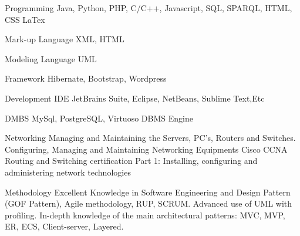 


\begin{cvskills}


\cvskill
{Programming} %
{Java, Python, PHP, C/C++, Javascript, SQL, SPARQL, HTML, CSS LaTex} %

\hline

\cvskill
{Mark-up Language} %
{XML, HTML} %

\hline

\cvskill
{Modeling Language} %
{UML} %

\hline

\cvskill
{Framework} %
{Hibernate, Bootstrap, Wordpress} %

\hline

\cvskill
{Development IDE} %
{JetBrains Suite, Eclipse, NetBeans, Sublime Text,Etc} %

\hline


\cvskill
{DMBS} %
{MySql, PostgreSQL, Virtuoso DBMS Engine} %

\hline

\cvskill
{Networking} %
{Managing and Maintaining the Servers, PC's, Routers and Switches. Configuring, Managing and Maintaining \newline Networking Equipments
	Cisco CCNA Routing and Switching certification Part 1:
	Installing, configuring and \newline administering network technologies 
} %
\hline

\cvskill
{Methodology} %
{Excellent Knowledge in Software Engineering and Design Pattern (GOF Pattern), Agile methodology, RUP, \newline SCRUM. Advanced use of UML with profiling. In-depth knowledge of the main architectural patterns: MVC, \newline MVP, ER, ECS, Client-server, Layered.
} %


\end{cvskills}
